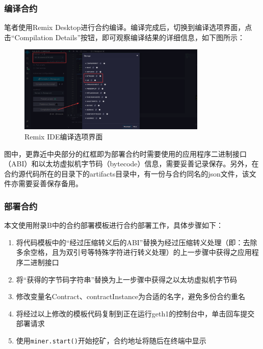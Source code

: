 \subsubsection{编译合约}

笔者使用Remix Desktop进行合约编译。编译完成后，切换到编译选项界面，点击“Compilation Details”按钮，即可观察编译结果的详细信息，如下图所示：

\begin{figure}[htbp]
    \centering
    \includegraphics[width=0.8\textwidth]{images/remix.png}
    \caption{Remix IDE编译选项界面}\label{Remix IDE编译选项界面} %
\end{figure}

图中，更靠近中央部分的红框即为部署合约时需要使用的应用程序二进制接口（ABI）和以太坊虚拟机字节码（bytecode）信息，需要妥善记录保存。另外，在合约源代码所在的目录下的artifacts目录中，有一份与合约同名的json文件，该文件亦需要妥善保存备用。

\subsubsection{部署合约}

本文使用附录B中的合约部署模板进行合约部署工作，具体步骤如下：

\begin{enumerate}
    \item 将代码模板中的“经过压缩转义后的ABI”替换为经过压缩转义处理（即：去除多余空格，且为双引号等特殊字符进行转义处理）的上一步骤中获得之应用程序二进制接口
    \item 将“获得的字节码字符串”替换为上一步骤中获得之以太坊虚拟机字节码
    \item 修改变量名Contract、contractInstance为合适的名字，避免多份合约重名
    \item 将经过以上修改的模板代码复制到正在运行geth1的控制台中，单击回车提交部署请求
    \item 使用\verb|miner.start()|开始挖矿，合约地址将随后在终端中显示
\end{enumerate}


